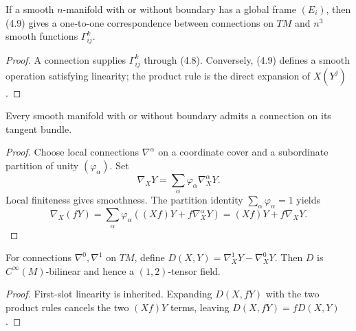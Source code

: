 \begin{lemma}
\label{lem:connections-from-connection-coefficients}
\leanok
If a smooth $n$-manifold with or without boundary has a global frame $(E_i)$, then (4.9) gives a one-to-one correspondence between connections on $TM$ and $n^3$ smooth functions $\Gamma^k_{ij}$.
\end{lemma}
\begin{proof}
\leanok
\sketch A connection supplies $\Gamma^k_{ij}$ through (4.8). Conversely, (4.9) defines a smooth operation satisfying linearity; the product rule is the direct expansion of $X(Y^j)$.
\end{proof}

\begin{proposition}
\label{prop:tangent-bundle-admits-connection}
Every smooth manifold with or without boundary admits a connection on its tangent bundle.
\end{proposition}
\begin{proof}
\sketch Choose local connections $\nabla^\alpha$ on a coordinate cover and a subordinate partition of unity $(\varphi_\alpha)$. Set
\begin{equation}
\nabla_XY=\sum_\alpha\varphi_\alpha\nabla_X^\alpha Y.\tag{4.11}
\end{equation}
Local finiteness gives smoothness. The partition identity $\sum_\alpha\varphi_\alpha=1$ yields
\[
\nabla_X(fY)=\sum_\alpha\varphi_\alpha((Xf)Y+f\nabla_X^\alpha Y)=(Xf)Y+f\nabla_XY.
\]
\end{proof}

\begin{proposition}
\label{prop:difference-tensor}
\leanok
For connections $\nabla^0,\nabla^1$ on $TM$, define $D(X,Y)=\nabla_X^1Y-\nabla_X^0Y$. Then $D$ is $C^\infty(M)$-bilinear and hence a $(1,2)$-tensor field.
\end{proposition}
\begin{proof}
\leanok
\sketch First-slot linearity is inherited. Expanding $D(X,fY)$ with the two product rules cancels the two $(Xf)Y$ terms, leaving $D(X,fY)=fD(X,Y)$.
\end{proof}

